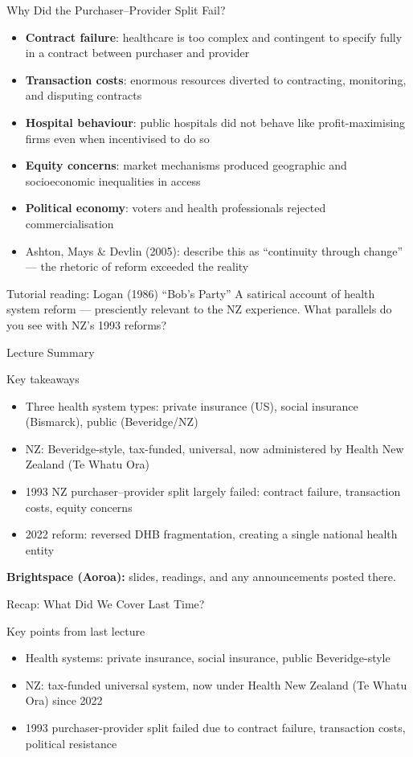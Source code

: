 \documentclass[aspectratio=169, 12pt]{beamer}
\newcommand{\recapslide}[1]{%
  \begin{frame}{Recap: What Did We Cover Last Time?}
    \begin{block}{Key points from last lecture}
      \begin{itemize}#1\end{itemize}
    \end{block}
  \end{frame}}
\newcommand{\summaryside}[1]{%
  \begin{frame}{Lecture Summary}
    \begin{exampleblock}{Key takeaways}
      \begin{itemize}#1\end{itemize}
    \end{exampleblock}
    \vspace{0.5em}
    {\footnotesize\textcolor{OtagoGold}{\textbf{Brightspace (Aoroa):}} slides, readings, and any announcements posted there.}
  \end{frame}}
\begin{document}
\begin{frame}{Why Did the Purchaser--Provider Split Fail?}
  \begin{itemize}
    \item \textbf{Contract failure}: healthcare is too complex and contingent to specify
          fully in a contract between purchaser and provider
    \item \textbf{Transaction costs}: enormous resources diverted to contracting,
          monitoring, and disputing contracts
    \item \textbf{Hospital behaviour}: public hospitals did not behave like
          profit-maximising firms even when incentivised to do so
    \item \textbf{Equity concerns}: market mechanisms produced geographic and socioeconomic
          inequalities in access
    \item \textbf{Political economy}: voters and health professionals rejected commercialisation
    \item Ashton, Mays \& Devlin (2005): describe this as ``continuity through change'' ---
          the rhetoric of reform exceeded the reality
  \end{itemize}
  \begin{exampleblock}{Tutorial reading: Logan (1986) ``Bob's Party''}
    A satirical account of health system reform --- presciently relevant to the NZ experience.
    What parallels do you see with NZ's 1993 reforms?
  \end{exampleblock}
\end{frame}

\summaryside{
  \item Three health system types: private insurance (US), social insurance (Bismarck), public (Beveridge/NZ)
  \item NZ: Beveridge-style, tax-funded, universal, now administered by Health New Zealand (Te Whatu Ora)
  \item 1993 NZ purchaser--provider split largely failed: contract failure, transaction costs, equity concerns
  \item 2022 reform: reversed DHB fragmentation, creating a single national health entity
}

\recapslide{
  \item Health systems: private insurance, social insurance, public Beveridge-style
  \item NZ: tax-funded universal system, now under Health New Zealand (Te Whatu Ora) since 2022
  \item 1993 purchaser-provider split failed due to contract failure, transaction costs, political resistance
}
\end{document}
